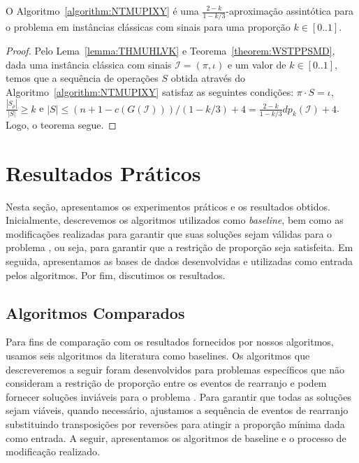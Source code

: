 \begin{theorem}\label{theorem:VWZUZNOR}
O Algoritmo~\ref{algorithm:NTMUPIXY} é uma $\frac{2-k}{1-k/3}$-aproximação assintótica para o problema \SbPRT{} em instâncias clássicas com sinais para uma proporção $k \in [0..1]$.
\end{theorem}
\begin{proof}
Pelo Lema~\ref{lemma:THMUHLVK} e Teorema~\ref{theorem:WSTPPSMD}, dada uma instância clássica com sinais $\mathcal{I} = (\pi,\iota)$ e um valor de $k \in [0..1]$, temos que a sequência de operações $S$ obtida através do Algoritmo~\ref{algorithm:NTMUPIXY} satisfaz as seguintes condições: $\pi \cdot S = \iota$, $\frac{|S_{\rho}|}{|S|} \ge k$ e $|S| \le (n+1-c(G(\mathcal{I}))) / (1-k/3) + 4 = \frac{2-k}{1-k/3} dp_k(\mathcal{I}) + 4$. Logo, o teorema segue.
\end{proof}

\section{Resultados Práticos}

Nesta seção, apresentamos os experimentos práticos e os resultados obtidos. Inicialmente, descrevemos os algoritmos utilizados como \emph{baseline}, bem como as modificações realizadas para garantir que suas soluções sejam válidas para o problema \SbPRT{}, ou seja, para garantir que a restrição de proporção seja satisfeita. Em seguida, apresentamos as bases de dados desenvolvidas e utilizadas como entrada pelos algoritmos. Por fim, discutimos os resultados.

\subsection{Algoritmos Comparados}\label{subsection:BBECOZCK}

Para fins de comparação com os resultados fornecidos por nossos algoritmos, usamos seis algoritmos da literatura como baselines. Os algoritmos que descreveremos a seguir foram desenvolvidos para problemas específicos que não consideram a restrição de proporção entre os eventos de rearranjo e podem fornecer soluções inviáveis para o problema \SbPRT{}. Para garantir que todas as soluções sejam viáveis, quando necessário, ajustamos a sequência de eventos de rearranjo substituindo transposições por reversões para atingir a proporção mínima dada como entrada. A seguir, apresentamos os algoritmos de baseline e o processo de modificação realizado.

